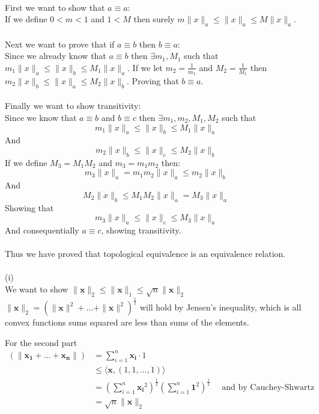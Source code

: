 \documentclass[letterpaper,12pt]{article}
\theoremstyle{definition}
\begin{document}
\\
First we want to show that $a\equiv a$:\\
If we define $0<m<1$ and $1<M$ then surely $m\|x\|_a \leq \|x\|_a \leq M \|x\| _a$.\\
\\ 
Next we want to prove that if $a \equiv b$ then $ b \equiv a$:\\
Since we already know that $a\equiv b$ then $\exists m_1,M_1$ such that $m_1\|x\|_a \leq \|x\|_b \leq M_1\|x\|_a$.
If we let $m_2 = \frac{1}{m_1}$ and $ M_2 = \frac{1}{M_1}$ then $m_2\|x\|_b \leq \|x\|_a \leq M_2\|x\|_b$. Proving that $b\equiv a$.\\
\\
Finally we want to show transitivity:\\
Since we know that $a\equiv b$ and $b\equiv c$ then $\exists m_1,m_2,M_1,M_2$ such that \\
\[m_1\|x\|_a \leq \|x\|_b \leq M_1 \|x\|_a\]
And
\[m_2\|x\|_b \leq \|x\|_c \leq M_2 \|x\|_b \] 
If we define $M_3 = M_1 M_2$ and $m_3 = m_1 m_2$ then:\\
\[m_3 \|x \|_a = m_1m_2\|x\|_a \leq m_2 \|x\|_b\]
And 
\[M_2 \|x\|_b \leq M_1M_2 \|x\|_a = M_3 \|x\|_a\]
Showing that 
\[ m_3 \|x \|_a \leq \|x\|_c \leq M_3 \|x\|_a \]
And consequentially $a\equiv c$, showing transitivity.\\
\\
Thus we have proved that topological equivalence is an equivalence relation.\\
\\
(i)\\
We want to show $\|\mathbf{x}\|_2 \leq \|\mathbf{x}\|_1 \leq \sqrt{n} \|\mathbf{x}\|_2$\\
$\|\mathbf{x}\|_2 = (\|\mathbf{x}\|^2 + \dots + \|\mathbf{x}\|^2)^{\frac{1}{2}} $ will hold by Jensen's inequality, which is all convex functions sums squared are less than sums of the elements.

For the second part
\begin{align*}
    (\|\mathbf{x_1} + \dots + \mathbf{x_n} \|) & = \sum_{i=1}^n \mathbf{x_i} \cdot 1 \\
    & \leq \langle \mathbf{x}, (1,1,\dots,1) \rangle  \\
    & = (\sum_{i=1}^n \mathbf{x_i}^2)^{\frac{1}{2}} (\sum_{i=1}^n \mathbf{1}^2)^{\frac{1}{2}} \quad \text{ and by Cauchey-Shwartz} \\
    & = \sqrt{n} \|\mathbf{x}\|_2
\end{align*}
\end{document}
